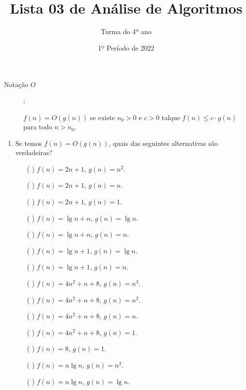 \documentclass[12pt]{article}
\title{Lista 03 de Análise de Algoritmos}
\date{1º Período de 2022}
\author{Turma do 4º ano}
\begin{document}
 

\maketitle

\begin{description}

\item[Notação $O$]: 

$f(n) = O(g(n))$ se existe $n_0>0$ e $c>0$ talque $f(n) \leq c\cdot g(n)$ para todo $n>n_0$.

\end{description}

\vspace{3em}



\begin{enumerate}

\item Se temos $f(n) = O(g(n))$, quais das seguintes alternativas são verdadeiras?

\begin{itemize}

\item[( )]  $f(n) = 2n + 1$, $g(n) = n^2$.

\item[( )]  $f(n) = 2n + 1$, $g(n) = n$.

\item[( )]  $f(n) = 2n + 1$, $g(n) = 1$.

\item[( )]  $f(n) = \lg n + n$, $g(n) = \lg n$.

\item[( )]  $f(n) = \lg n + n$, $g(n) = n$.

\item[( )]  $f(n) = \lg n + 1$, $g(n) = \lg n$.

\item[( )]  $f(n) = \lg n + 1$, $g(n) = n$.

\item[( )]  $f(n) = 4n^2 + n + 8$, $g(n) = n^3$.

\item[( )]  $f(n) = 4n^2 + n + 8$, $g(n) = n^2$.

\item[( )]  $f(n) = 4n^2 + n + 8$, $g(n) = n$.

\item[( )]  $f(n) = 4n^2 + n + 8$, $g(n) = 1$.

\item[( )]  $f(n) = 8$, $g(n) = 1$.

\item[( )]  $f(n) = n\lg n$, $g(n) = n^2$.

\item[( )]  $f(n) = n\lg n$, $g(n) = \lg n$.

\end{itemize}


\end{enumerate}
\end{document}
